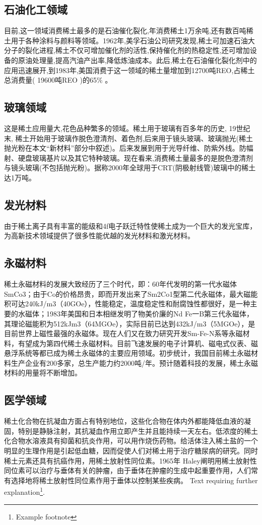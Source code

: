 \documentclass[twoside,twocolumn]{article}
\begin{document}
\subsection{石油化工领域}
目前,这一领域消费稀土最多的是石油催化裂化,年消费稀土1万余吨,还有数百吨稀土用于各种涂料与颜料等领域。1962年,美孚石油公司研究发现,稀土可加速石油大分子的裂化进程,稀土不仅可增加催化剂的活性,保持催化剂的热稳定性,还可增加设备的原油处理量,提高汽油产出率,降低炼油成本。此后,稀土在石油催化裂化剂中的应用迅速展开,到1983年,美国消费于这一领域的稀土量增加到12700吨REO,占稀土总消费量( 19600吨REO )的65$\%$ 。
\subsection{玻璃领域}
这是稀土应用量大,花色品种繁多的领域。稀土用于玻璃有百多年的历史, 19世纪末, 稀土开始用于玻璃作脱色澄清剂、着色剂,后来用于镜头玻璃、玻璃抛光(稀土抛光粉在本文“新材料”部分中叙述)。后来发展到用于光导纤维、防紫外线。防幅射、硬盘玻璃基片以及其它特种玻璃。现在看来,消费稀土量最多的是脱色澄清剂与镜头玻璃(不包括抛光粉)。据称2000年全球用于CRT(阴极射线管)玻璃中的稀土达1万吨。
\subsection{发光材料}
由于稀土离子具有丰富的能级和4f电子跃迁特性使稀土成为一个巨大的发光宝库，为高新技术领域提供了很多性能优越的发光材料和激光材料。
\subsection{永磁材料}
稀土永磁材料的发展大致经历了三个时代，即：60年代发明的第一代水磁体SmCo3；由于Co的价格昂贵，即而开发出来了Sm2Co1型第二代永磁体，最大磁能积可达240kJ/m3（40GOe），性能稳定，温度稳定性和耐腐蚀性都很好，是一种主要的水磁体；1983年美国和日本相继发明了物美价廉的Nd Fe一B第三代永磁体，其理论磁能积为512kJm3（64MGOe），实际目前已达到432kJ/m3（5MGOe），是目前世界上磁性最强的永磁体。现在人们又在致力研究开发Sm-Fe-N系等永磁材料，有望成为第四代稀土永磁材料。目前飞速发展的电子计算机、磁电式仪表、磁悬浮系统等都已成为稀土永磁体的主要应用领域。初步统计，我国目前稀土永磁材料生产企业有200多家，总生产能力约2000吨/年。预计随着科技的发展，稀土永磁材料的用量将不断增加。
\subsection{医学领域}
稀土化合物在抗凝血方面占有特别地位，这些化合物在体内外都能降低血液的凝固，特别是静脉注射，其抗凝血作用立即产生并且能持续一天左右。低浓度的稀土化合物水溶液具有抑菌和抗炎作用，可以用作烧伤药物。给活体注入稀土盐的一个明显的生理作用是引起低血糖，因而促使人们对稀土用于治疗糖尿病的研究。同时稀土元素还具有抗癌作用，用稀土放射性同位素。1965年 Haley阐明用稀土放射性同位素可以治疗与垂体有关的肿瘤，由于垂体在肿瘤的生成中起重要作用，人们常有选择地将稀土放射性同位素作用于垂体以控制某些疾病。
Text requiring further explanation\footnote{Example footnote}.
\end{document}

